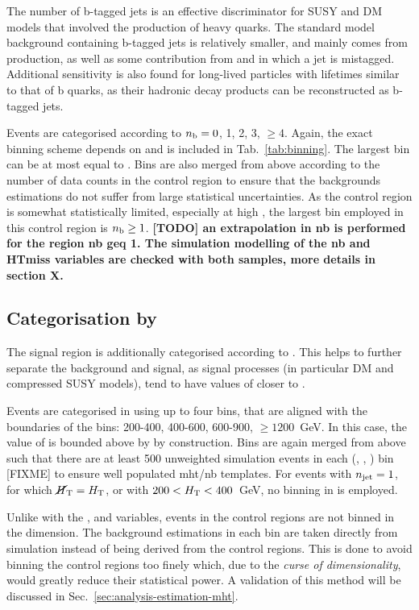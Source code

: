 The number of b-tagged jets is an effective discriminator for SUSY and DM 
models that involved the production of heavy quarks. The standard model 
background containing b-tagged jets is relatively smaller, and mainly comes 
from \ttbar production, as well as some contribution from \wj and \zj in which 
a jet is mistagged. Additional sensitivity is also found for long-lived 
particles with lifetimes similar to that of b quarks, as their hadronic decay 
products can be reconstructed as b-tagged jets.

Events are categorised according to $n_{\text{b}} = 0$, 1, 2, 3, $\geq4$.
Again, the exact binning scheme depends on \njet and is included in 
Tab.~\ref{tab:binning}.
The largest \nb bin can be at most equal to \njet. Bins are also merged from 
above according to the number of data counts in the \mj control region to 
ensure that the backgrounds estimations do not suffer from large statistical 
uncertainties.
As the \mmj control region is somewhat statistically limited, especially at 
high \nb, the largest \nb bin employed in this control region is $n_{\text{b}} \geq 1$.
\textbf{[TODO] an extrapolation in nb is performed for the region nb geq 1. The 
simulation modelling of the nb and HTmiss variables are checked with both 
samples, more details in section X.}

\subsection*{Categorisation by \mht}

The signal region is additionally categorised according to \mht. This helps to 
further separate the background and signal, as signal processes (in particular 
DM and compressed SUSY models), tend to have values of \mht closer to \scalht.

Events are categorised in \mht using up to four bins, that are aligned with the 
boundaries of the \scalht bins: 200-400, 400-600, 600-900, $\geq1200$~GeV. In 
this case, the value of \mht is bounded above by \scalht by construction. Bins 
are again merged from above such that there are at least 500 unweighted 
simulation events in each (\njet, \scalht, \mht) bin [FIXME] to ensure well 
populated mht/nb templates. For events with $n_{\text{jet}}=1$, for which 
$\mbox{$\cancel{H}_\text{T}$}=\mbox{$H_\text{T}$}$, or with $200<\mbox{$H_\text{T}$}<400$~GeV, no binning in \mht is employed.

Unlike with the \njet, \nb and \scalht variables, events in the control regions 
are not binned in the \mht dimension. The background estimations in each \mht 
bin are taken directly from simulation instead of being derived from the 
control regions. This is done to avoid binning the control regions too finely 
which, due to the \textit{curse of dimensionality}, would greatly reduce their 
statistical power. A validation of this method will be discussed in 
Sec.~\ref{sec:analysis-estimation-mht}.

